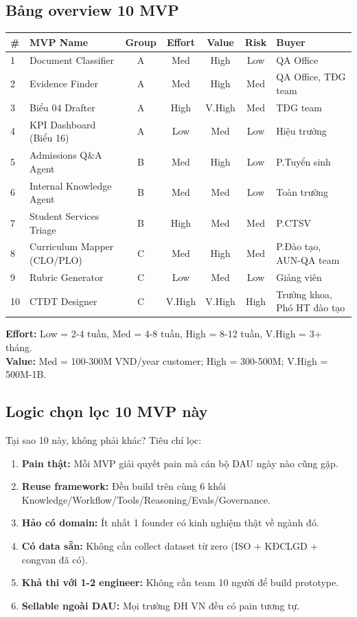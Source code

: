 \documentclass[11pt,a4paper]{article}
\begin{document}
\subsection{Bảng overview 10 MVP}

\begin{tabularx}{\linewidth}{@{}p{0.4cm} p{4cm} c c c c X@{}}
\toprule
\textbf{\#} & \textbf{MVP Name} & \textbf{Group} & \textbf{Effort} & \textbf{Value} & \textbf{Risk} & \textbf{Buyer} \\
\midrule
1 & Document Classifier & A & Med & High & Low & QA Office \\
2 & Evidence Finder & A & Med & High & Med & QA Office, TĐG team \\
3 & Biểu 04 Drafter & A & High & V.High & Med & TĐG team \\
4 & KPI Dashboard (Biểu 16) & A & Low & Med & Low & Hiệu trưởng \\
5 & Admissions Q\&A Agent & B & Med & High & Low & P.Tuyển sinh \\
6 & Internal Knowledge Agent & B & Med & Med & Low & Toàn trường \\
7 & Student Services Triage & B & High & Med & Med & P.CTSV \\
8 & Curriculum Mapper (CLO/PLO) & C & Med & High & Med & P.Đào tạo, AUN-QA team \\
9 & Rubric Generator & C & Low & Med & Low & Giảng viên \\
10 & CTĐT Designer & C & V.High & V.High & High & Trưởng khoa, Phó HT đào tạo \\
\bottomrule
\end{tabularx}

\textbf{Effort:} Low = 2-4 tuần, Med = 4-8 tuần, High = 8-12 tuần, V.High = 3+ tháng.\\
\textbf{Value:} Med = 100-300M VND/year customer; High = 300-500M; V.High = 500M-1B.

\subsection{Logic chọn lọc 10 MVP này}

Tại sao 10 này, không phải khác? Tiêu chí lọc:

\begin{enumerate}
\item \textbf{Pain thật:} Mỗi MVP giải quyết pain mà cán bộ DAU ngày nào cũng gặp.
\item \textbf{Reuse framework:} Đều build trên cùng 6 khối Knowledge/Workflow/Tools/Reasoning/Evals/Governance.
\item \textbf{Hảo có domain:} Ít nhất 1 founder có kinh nghiệm thật về ngành đó.
\item \textbf{Có data sẵn:} Không cần collect dataset từ zero (ISO + KĐCLGD + congvan đã có).
\item \textbf{Khả thi với 1-2 engineer:} Không cần team 10 người để build prototype.
\item \textbf{Sellable ngoài DAU:} Mọi trường ĐH VN đều có pain tương tự.
\end{enumerate}
\end{document}
